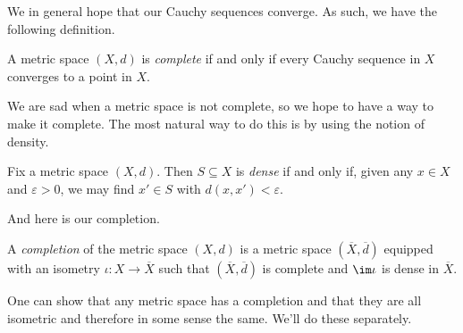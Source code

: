\documentclass[../notes.tex]{subfiles}
\begin{document}
We in general hope that our Cauchy sequences converge. As such, we have the following definition.
\begin{definition}[Complete]
	A metric space $(X,d)$ is \textit{complete} if and only if every Cauchy sequence in $X$ converges to a point in $X$.
\end{definition}
We are sad when a metric space is not complete, so we hope to have a way to make it complete. The most natural way to do this is by using the notion of density.
\begin{definition}[Dense]
	Fix a metric space $(X,d)$. Then $S\subseteq X$ is \textit{dense} if and only if, given any $x\in X$ and $\varepsilon>0$, we may find $x'\in S$ with $d(x,x')<\varepsilon$.
\end{definition}
And here is our completion.
\begin{definition}[Completion]
	A \textit{completion} of the metric space $(X,d)$ is a metric space $(\overline X,\overline d)$ equipped with an isometry $\iota\colon X\to\overline X$ such that $(\overline X,\overline d)$ is complete and $\im\iota$ is dense in $\overline X$.
\end{definition}
One can show that any metric space has a completion and that they are all isometric and therefore in some sense the same. We'll do these separately.
\end{document}
